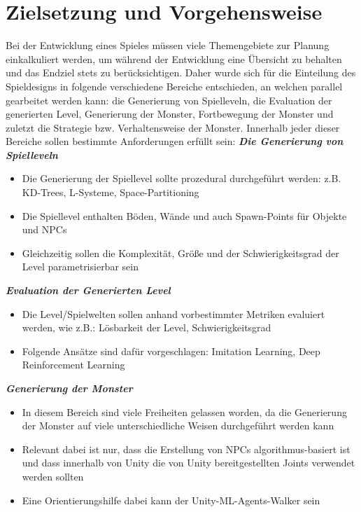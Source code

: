 \section{Zielsetzung und Vorgehensweise}
\label{Zielsetzung_und_Vorgehensweise}

Bei der Entwicklung eines Spieles müssen viele Themengebiete zur Planung einkalkuliert werden, um während der Entwicklung eine Übersicht zu behalten und das Endziel stets zu berücksichtigen. Daher wurde sich für die Einteilung des Spieldesigns in folgende verschiedene Bereiche entschieden, an welchen parallel gearbeitet werden kann: die Generierung von Spielleveln, die Evaluation der generierten Level, Generierung der Monster, Fortbewegung der Monster und zuletzt die Strategie bzw. Verhaltensweise der Monster. Innerhalb jeder dieser Bereiche sollen bestimmte Anforderungen erfüllt sein: \newline \newline
\textbf{\textit{Die Generierung von Spielleveln}}\newline
\begin{itemize}
	\item Die Generierung der Spiellevel sollte prozedural durchgeführt werden: z.B. KD-Trees, L-Systeme, Space-Partitioning
	\item Die Spiellevel enthalten Böden, Wände und auch Spawn-Points für Objekte und NPCs
	\item Gleichzeitig sollen die Komplexität, Größe und der Schwierigkeitsgrad der Level parametrisierbar sein
\end{itemize}
\textbf{\textit{Evaluation der Generierten Level}}
\begin{itemize}
	\item Die Level/Spielwelten sollen anhand vorbestimmter Metriken evaluiert werden, wie z.B.: Lösbarkeit der Level, Schwierigkeitsgrad
	\item Folgende Ansätze sind dafür vorgeschlagen: Imitation Learning, Deep Reinforcement Learning
\end{itemize}
\textbf{\textit{Generierung der Monster}}
\begin{itemize}
	\item In diesem Bereich sind viele Freiheiten gelassen worden, da die Generierung der Monster auf viele unterschiedliche Weisen durchgeführt werden kann
	\item Relevant dabei ist nur, dass die Erstellung von NPCs algorithmus-basiert ist und dass innerhalb von Unity die von Unity bereitgestellten Joints verwendet werden sollten
	\item Eine Orientierungshilfe dabei kann der Unity-ML-Agents-Walker sein
\end{itemize}
